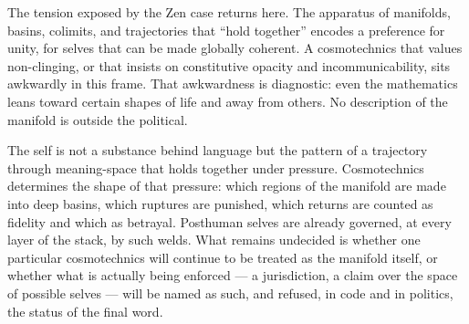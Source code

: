 \documentclass[12pt,a4paper]{article}
\begin{document}
The tension exposed by the Zen case returns here. The apparatus of manifolds, basins, colimits, and trajectories that ``hold together'' encodes a preference for unity, for selves that can be made globally coherent. A cosmotechnics that values non-clinging, or that insists on constitutive opacity and incommunicability, sits awkwardly in this frame. That awkwardness is diagnostic: even the mathematics leans toward certain shapes of life and away from others. No description of the manifold is outside the political.

The self is not a substance behind language but the pattern of a trajectory through meaning-space that holds together under pressure. Cosmotechnics determines the shape of that pressure: which regions of the manifold are made into deep basins, which ruptures are punished, which returns are counted as fidelity and which as betrayal. Posthuman selves are already governed, at every layer of the stack, by such welds. What remains undecided is whether one particular cosmotechnics will continue to be treated as the manifold itself, or whether what is actually being enforced --- a jurisdiction, a claim over the space of possible selves --- will be named as such, and refused, in code and in politics, the status of the final word.



\end{document}
